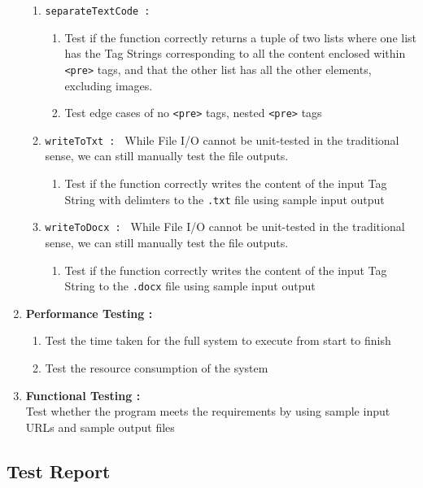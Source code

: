 \documentclass[12pt]{scrreprt}
\begin{document}
\begin{enumerate}
\begin{enumerate}
        \item \texttt{separateTextCode : }
        \begin{enumerate}
            \item Test if the function correctly returns a tuple of two lists where one list has the Tag Strings corresponding to all the content enclosed within \texttt{<pre>} tags, and that the other list has all the other elements, excluding images.
            \item Test edge cases of no \texttt{<pre>} tags, nested \texttt{<pre>} tags
        \end{enumerate}

        \item \texttt{writeToTxt : }
        While File I/O cannot be unit-tested in the traditional sense, we can still manually test the file outputs.
        \begin{enumerate}
            \item Test if the function correctly writes the content of the input Tag String with delimters to the \texttt{.txt} file using sample input output
        \end{enumerate}

        \item \texttt{writeToDocx : }
        While File I/O cannot be unit-tested in the traditional sense, we can still manually test the file outputs.
        \begin{enumerate}
            \item Test if the function correctly writes the content of the input Tag String to the \texttt{.docx} file using sample input output
        \end{enumerate}

    \end{enumerate}
    \item \textbf{Performance Testing : } 
    \begin{enumerate}
        \item Test the time taken for the full system to execute from start to finish
        \item Test the resource consumption of the system
    \end{enumerate}
    \item \textbf{Functional Testing : } \\ Test whether the program meets the requirements by using sample input URLs and sample output files
\end{enumerate}


\subsection{Test Report}
\end{document}
